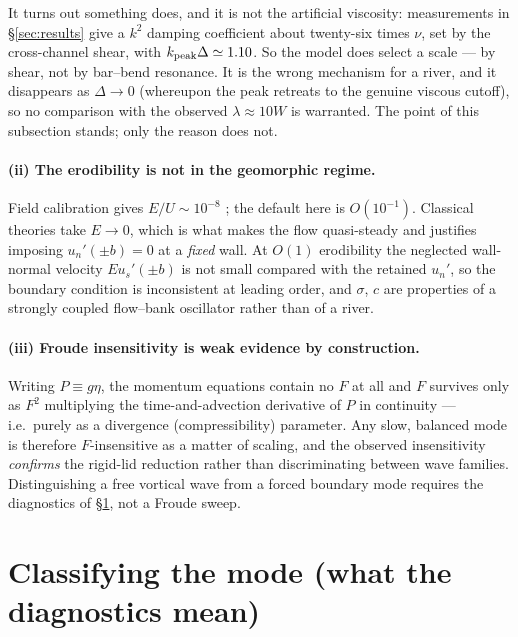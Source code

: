 \documentclass[11pt]{article}
\newcommand{\us}{u_s}
\newcommand{\un}{u_n}
\begin{document}
It turns out something does, and it is not the artificial viscosity: measurements in
\S\ref{sec:results} give a $k^2$ damping coefficient about twenty-six times $\nu$, set by
the cross-channel shear, with $k_{\rm peak}\Delta\simeq1.10$. So the model does select a
scale --- by shear, not by bar--bend resonance. It is the wrong mechanism for a river,
and it disappears as $\Delta\to0$ (whereupon the peak retreats to the genuine viscous
cutoff), so no comparison with the observed $\lambda\approx10W$ \cite{leopold1960} is
warranted. The point of this subsection stands; only the reason does not.

\paragraph{(ii) The erodibility is not in the geomorphic regime.} Field calibration
gives $E/U\sim10^{-8}$ \cite{hasegawa1977,nanson1986}; the default here is
$O(10^{-1})$. Classical theories take $E\to0$, which is what makes the flow
quasi-steady and justifies imposing $\un'(\pm b)=0$ at a \emph{fixed} wall. At
$O(1)$ erodibility the neglected wall-normal velocity $E\us'(\pm b)$ is not small
compared with the retained $\un'$, so the boundary condition is inconsistent at
leading order, and $\sigma$, $c$ are properties of a strongly coupled flow--bank
oscillator rather than of a river.

\paragraph{(iii) Froude insensitivity is weak evidence by construction.} Writing
$P\equiv g\eta$, the momentum equations contain no $F$ at all and $F$ survives only
as $F^{2}$ multiplying the time-and-advection derivative of $P$ in continuity ---
i.e.\ purely as a divergence (compressibility) parameter. Any slow, balanced mode is
therefore $F$-insensitive as a matter of scaling, and the observed insensitivity
\emph{confirms} the rigid-lid reduction rather than discriminating between wave
families. Distinguishing a free vortical wave from a forced boundary mode requires
the diagnostics of \S\ref{sec:classify}, not a Froude sweep.

\section{Classifying the mode (what the diagnostics mean)}
\label{sec:classify}
\end{document}
